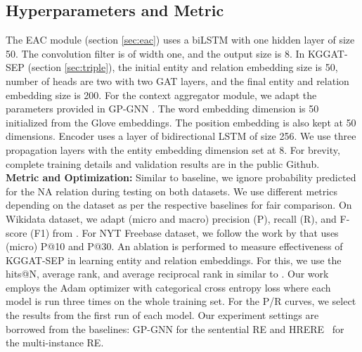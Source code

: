 \documentclass[sigconf]{acmart}
\begin{document}
\subsection{Hyperparameters and Metric}
The EAC module (section \ref{sec:eac}) uses a biLSTM with one hidden layer of size 50. The convolution filter is of width one, and the output size is 8. In KGGAT-SEP (section \ref{sec:triple}), the initial entity and relation embedding size is 50, number of heads are two with two GAT layers, and the final entity and relation embedding size is 200. For the context aggregator module, we adapt the parameters provided in GP-GNN \cite{DBLP:conf/acl/ZhuLLFCS19}. The word embedding dimension is 50 initialized from the Glove embeddings. The position embedding is also kept at 50 dimensions. Encoder uses a layer of bidirectional LSTM of size 256. We use three propagation layers with the entity embedding dimension set at 8. For brevity, complete training details and validation results are in the public Github. \\
\textbf{Metric and Optimization:}  Similar to baseline, we ignore probability predicted for the NA relation during testing on both datasets. We use different metrics depending on the dataset as per the respective baselines for fair comparison. On Wikidata dataset, we adapt (micro and macro) precision (P), recall (R), and F-score (F1) from \cite{DBLP:conf/emnlp/SorokinG17}. For NYT Freebase dataset, we follow the work by \cite{DBLP:conf/naacl/XuB19} that uses (micro) P@10 and P@30. 
An ablation is performed to measure effectiveness of KGGAT-SEP in learning entity and relation embeddings. For this, we use the hits@N, average rank, and average reciprocal rank in similar to \cite{DBLP:conf/acl/NathaniCSK19}. Our work employs the Adam optimizer \cite{DBLP:journals/corr/KingmaB14} with categorical cross entropy loss where each model is run three times on the whole training set. For the P/R curves, we select the results from the first run of each model. Our experiment settings are borrowed from the baselines: GP-GNN \cite{DBLP:conf/acl/ZhuLLFCS19} for the sentential RE and HRERE~\cite{DBLP:conf/naacl/XuB19} for the multi-instance RE.
\end{document}
